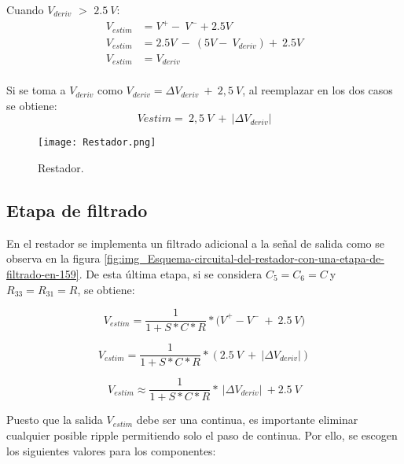 \noindent Cuando $V_{deriv}$ $\mathrm{>}$ $2.5\:V$: 
\begin{equation*} 
	\begin{aligned}
		V_{estim}&=V^+-\ V^-+2.5V\\ 
		V_{estim}&=2.5V\ -\ (5V-\ V_{deriv})+\ 2.5V\\
		V_{estim}&=V_{deriv}\\
	\end{aligned}
\end{equation*}

\noindent Si se toma a $V_{deriv}$ como $V_{deriv}=\mathit{\Delta}V_{deriv}\ +\ 2,5\: V$, al reemplazar en los dos casos se obtiene:
\begin{equation} \label{eq_rest_3}
	Vestim=\ 2,5\ V\ +\ |\mathit{\Delta}V_{deriv}|
\end{equation}

\begin{figure}[H]
	\centering
	\texttt{[image: Restador.png]}
	\caption{Restador.}
	\label{fig:img_Restador}
\end{figure}

\subsection{Etapa de filtrado}

\noindent En el restador se implementa un filtrado adicional a la se\~{n}al de salida como se observa en la figura  \ref{fig:img_Esquema-circuital-del-restador-con-una-etapa-de-filtrado-en-159}. De esta \'{u}ltima etapa, si se considera $C_5=C_6=C\ $y $R_{33}=R_{31}=R$, se obtiene:



\begin{equation}
	V_{estim}=\frac{1}{1+S*C*R}*{(V}^+-V^-\ +\ 2.5\:V)
\end{equation}

\begin{equation} \label{eq_Vestim_1}
	V_{estim}=\frac{1}{1+S*C*R}*(2.5\: V\ +\ |\mathit{\Delta}V_{deriv}|)
\end{equation}

\begin{equation} \label{eq_Vestim_2}
	V_{estim} \approx \frac{1}{1+S*C*R}*\ |\mathit{\Delta}V_{deriv}|\ +2.5\:V
\end{equation}



\noindent Puesto que la salida $V_{estim}$ debe ser una continua, es importante eliminar cualquier posible ripple permitiendo solo el paso de continua. Por ello, se escogen los siguientes valores para los componentes:

